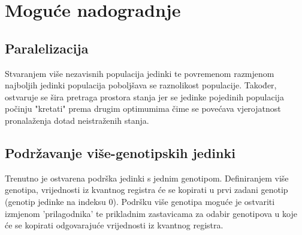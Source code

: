 \documentclass[times, utf8, zavrsni, numeric]{fer}
\begin{document}
%
%

\chapter{Moguće nadogradnje} \label{ch:nadogradnja}
\section{Paralelizacija}
Stvaranjem više nezavisnih populacija jedinki te povremenom razmjenom najboljih jedinki populacija poboljšava se raznolikost populacije. Također, ostvaruje se šira pretraga prostora stanja jer se jedinke pojedinih populacija počinju "kretati" prema drugim optimumima čime se povećava vjerojatnost pronalaženja dotad neistraženih stanja. \citep{han_phd}

\section{Podržavanje više-genotipskih jedinki}
Trenutno je ostvarena podrška jedinki s jednim genotipom. Definiranjem više genotipa, vrijednosti iz kvantnog registra će se kopirati u prvi zadani genotip (genotip jedinke na indeksu 0). Podršku više genotipa moguće je ostvariti izmjenom 'prilagodnika' te prikladnim zastavicama za odabir genotipova u koje će se kopirati odgovarajuće vrijednosti iz kvantnog registra.
\end{document}
